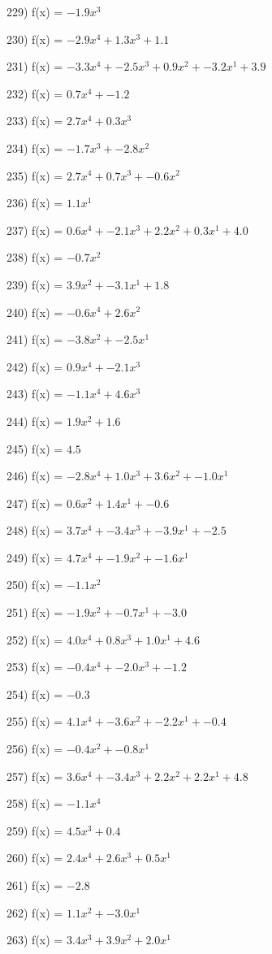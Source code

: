 \documentclass[10pt,a4paper]{article}
\begin{document}
229) f(x) = $-1.9x^3$

230) f(x) = $-2.9x^4 + 1.3x^3 + 1.1$

231) f(x) = $-3.3x^4 + -2.5x^3 + 0.9x^2 + -3.2x^1 + 3.9$

232) f(x) = $0.7x^4 + -1.2$

233) f(x) = $2.7x^4 + 0.3x^3$

234) f(x) = $-1.7x^3 + -2.8x^2$

235) f(x) = $2.7x^4 + 0.7x^3 + -0.6x^2$

236) f(x) = $1.1x^1$

237) f(x) = $0.6x^4 + -2.1x^3 + 2.2x^2 + 0.3x^1 + 4.0$

238) f(x) = $-0.7x^2$

239) f(x) = $3.9x^2 + -3.1x^1 + 1.8$

240) f(x) = $-0.6x^4 + 2.6x^2$

241) f(x) = $-3.8x^2 + -2.5x^1$

242) f(x) = $0.9x^4 + -2.1x^3$

243) f(x) = $-1.1x^4 + 4.6x^3$

244) f(x) = $1.9x^2 + 1.6$

245) f(x) = $4.5$

246) f(x) = $-2.8x^4 + 1.0x^3 + 3.6x^2 + -1.0x^1$

247) f(x) = $0.6x^2 + 1.4x^1 + -0.6$

248) f(x) = $3.7x^4 + -3.4x^3 + -3.9x^1 + -2.5$

249) f(x) = $4.7x^4 + -1.9x^2 + -1.6x^1$

250) f(x) = $-1.1x^2$

251) f(x) = $-1.9x^2 + -0.7x^1 + -3.0$

252) f(x) = $4.0x^4 + 0.8x^3 + 1.0x^1 + 4.6$

253) f(x) = $-0.4x^4 + -2.0x^3 + -1.2$

254) f(x) = $-0.3$

255) f(x) = $4.1x^4 + -3.6x^2 + -2.2x^1 + -0.4$

256) f(x) = $-0.4x^2 + -0.8x^1$

257) f(x) = $3.6x^4 + -3.4x^3 + 2.2x^2 + 2.2x^1 + 4.8$

258) f(x) = $-1.1x^4$

259) f(x) = $4.5x^3 + 0.4$

260) f(x) = $2.4x^4 + 2.6x^3 + 0.5x^1$

261) f(x) = $-2.8$

262) f(x) = $1.1x^2 + -3.0x^1$

263) f(x) = $3.4x^3 + 3.9x^2 + 2.0x^1$
\end{document}
